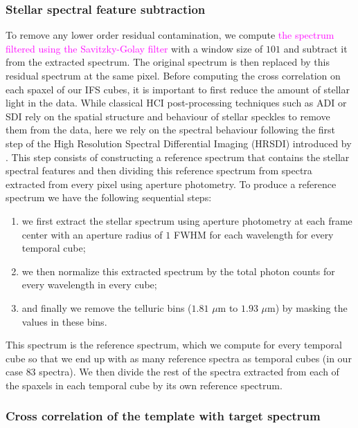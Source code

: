 \documentclass[referee]{aa} %
\newcommand{\newchange}[1]{\textcolor{magenta}{#1}}
\begin{document}
\subsubsection{Stellar spectral feature subtraction}

To remove any lower order residual contamination, we compute \newchange{the spectrum filtered using the Savitzky-Golay filter \citep{1964SavitzkyGolay}} with a window size of $101$ and subtract it from the extracted spectrum. The original spectrum is then replaced by this residual spectrum at the same pixel.
Before computing the cross correlation on each spaxel of our IFS cubes, it is important to first reduce the amount of stellar light in the data. 
While classical HCI post-processing techniques such as ADI or SDI rely on the spatial structure and behaviour of stellar speckles to remove them from the data, here we rely on the spectral behaviour following the first step of the High Resolution Spectral Differential Imaging (HRSDI) introduced by \citet{2019Haffert}. 
This step consists of constructing a reference spectrum that contains the stellar spectral features and then dividing \citep[or subtracting, in the case of][]{2019Haffert} this reference spectrum from spectra extracted from every pixel using aperture photometry. 
To produce a reference spectrum we have the following sequential steps:
\begin{enumerate}
    \item we first extract the stellar spectrum using aperture photometry at each frame center with an aperture radius of $1$ FWHM for each wavelength for every temporal cube;
    \item we then normalize this extracted spectrum by the total photon counts for every wavelength in every cube;
    \item and finally we remove the telluric bins ($1.81$ $\mu$m to $1.93$ $\mu$m) by masking the values in these bins.
\end{enumerate}
This spectrum is the reference spectrum, which we compute for every temporal cube so that we end up with as many reference spectra as temporal cubes (in our case $83$ spectra).
We then divide the rest of the spectra extracted from each of the spaxels in each temporal cube by its own reference spectrum.

\subsubsection{Cross correlation of the template with target spectrum}\label{sec: CC algorithm}
\end{document}

